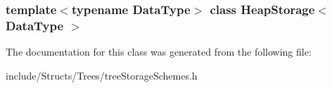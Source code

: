 \subsubsection*{template$<$typename DataType$>$ class HeapStorage$<$ DataType $>$}



The documentation for this class was generated from the following file:\begin{DoxyCompactItemize}
\item 
include/Structs/Trees/treeStorageSchemes.h\end{DoxyCompactItemize}
